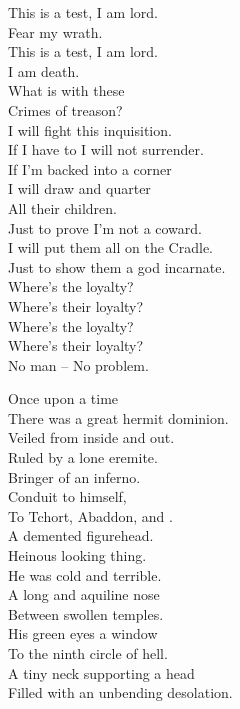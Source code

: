 This is a test, I am lord. \\
Fear my wrath. \\
This is a test, I am lord. \\
I am death. \\

What is with these \\
Crimes of treason? \\
I will fight this inquisition. \\
If I have to I will not surrender. \\
If I'm backed into a corner \\
I will draw and quarter \\
All their children. \\
Just to prove I'm not a coward. \\
I will put them all on the  Cradle. \\
Just to show them a god incarnate. \\

Where's the loyalty? \\
Where's their loyalty? \\
Where's the loyalty? \\
Where's their loyalty? \\
No man -- No problem. \\




Once upon a time \\
There was a great hermit dominion. \\
Veiled from inside and out. \\
Ruled by a lone eremite. \\
Bringer of an inferno. \\
Conduit to  himself, \\
To Tchort, Abaddon, and . \\
A demented figurehead. \\

Heinous looking thing. \\
He was cold and terrible. \\
A long and aquiline nose \\
Between swollen temples. \\
His green eyes a window \\
To the ninth circle of hell. \\
A tiny neck supporting a head \\
Filled with an unbending desolation. \\

